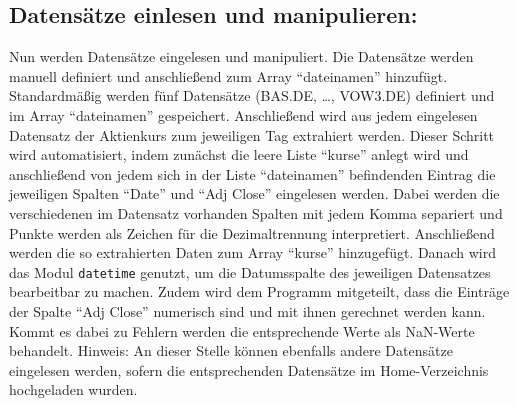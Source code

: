 \documentclass[paper=landscape]{scrartcl}
\begin{document}
    \hypertarget{datensuxe4tze-einlesen-und-manipulieren}{%
\subsection{Datensätze einlesen und
manipulieren:}\label{datensuxe4tze-einlesen-und-manipulieren}}

Nun werden Datensätze eingelesen und manipuliert. Die Datensätze werden
manuell definiert und anschließend zum Array ``dateinamen'' hinzufügt.
Standardmäßig werden fünf Datensätze (BAS.DE, \ldots, VOW3.DE) definiert
und im Array ``dateinamen'' gespeichert. Anschließend wird aus jedem
eingelesen Datensatz der Aktienkurs zum jeweiligen Tag extrahiert
werden. Dieser Schritt wird automatisiert, indem zunächst die leere
Liste ``kurse'' anlegt wird und anschließend von jedem sich in der Liste
``dateinamen'' befindenden Eintrag die jeweiligen Spalten ``Date'' und
``Adj Close'' eingelesen werden. Dabei werden die verschiedenen im
Datensatz vorhanden Spalten mit jedem Komma separiert und Punkte werden
als Zeichen für die Dezimaltrennung interpretiert. Anschließend werden
die so extrahierten Daten zum Array ``kurse'' hinzugefügt. Danach wird
das Modul \texttt{datetime} genutzt, um die Datumsspalte des jeweiligen
Datensatzes bearbeitbar zu machen. Zudem wird dem Programm mitgeteilt,
dass die Einträge der Spalte ``Adj Close'' numerisch sind und mit ihnen
gerechnet werden kann. Kommt es dabei zu Fehlern werden die
entsprechende Werte als NaN-Werte behandelt. Hinweis: An dieser Stelle
können ebenfalls andere Datensätze eingelesen werden, sofern die
entsprechenden Datensätze im Home-Verzeichnis hochgeladen wurden.
\end{document}
